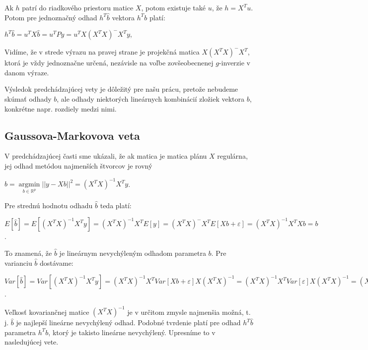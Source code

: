 Ak $h$ patrí do riadkového priestoru matice $X$, potom existuje také $u$, že $h = X^T u$.
Potom pre jednoznačný odhad $h^T \hat{b}$ vektora $h^T b$ platí:

\begin{center}
$h^T \hat{b} = u^T X \hat{b} = u^T P y = u^T X(X^T X)^- X^T y$,
\end{center}

Vidíme, že v strede výrazu na pravej strane je projekčná matica $X(X^T X)^- X^T$, ktorá je vždy jednoznačne určená, 
nezávisle na voľbe zovšeobecnenej $g$-inverzie v danom výraze.

Výsledok predchádzajúcej vety je dôležitý pre našu prácu, pretože nebudeme skúmať odhady $b$,
ale odhady niektorých lineárnych kombinácií zložiek vektora $b$, 
konkrétne napr. rozdiely medzi nimi.

\subsection{Gaussova-Markovova veta}

V predchádzajúcej časti sme ukázali, že ak matica je matica plánu $X$ regulárna,
jej odhad metódou najmenších štvorcov je rovný

\begin{center}
$
\hat{b} = \underset{b \in \mathbb{R}^{p}}{\operatorname{arg min}} ||y - Xb||^2 = (X^T X)^{-1} X^T y
$.
\end{center}

Pre strednú hodnotu odhadu $\hat{b}$ teda platí:

\begin{center}
$
E[\hat{b}] = E[(X^T X)^{-1} X^T y] = (X^T X)^{-1} X^T E[y] = (X^T X)^- X^T E[Xb + \varepsilon] = (X^T X)^{-1} X^T X b = b
$.
\end{center}

To znamená, že $\hat{b}$ je lineárnym nevychýleným odhadom parametra $b$.
Pre varianciu $\hat{b}$ dostávame:

\begin{center}
$
Var[\hat{b}] = Var[(X^T X)^{-1} X^T y] = (X^T X)^{-1} X^T Var[Xb + \varepsilon] X (X^T X)^{-1} =
(X^T X)^{-1} X^T Var[\varepsilon] X (X^T X)^{-1} = (X^T X)^{-1} X^T I X (X^T X)^{-1} = (X^T X)^{-1}
$.
\end{center}

Veľkosť kovariančnej matice $(X^T X)^{-1}$ je v určitom zmysle najmenšia možná, t. j. $\hat{b}$ je najlepší lineárne nevychýlený odhad.
Podobné tvrdenie platí pre odhad $h^T \hat{b}$ parametra $h^T b$, ktorý je takisto lineárne nevychýlený. Upresníme to v nasledujúcej vete.


